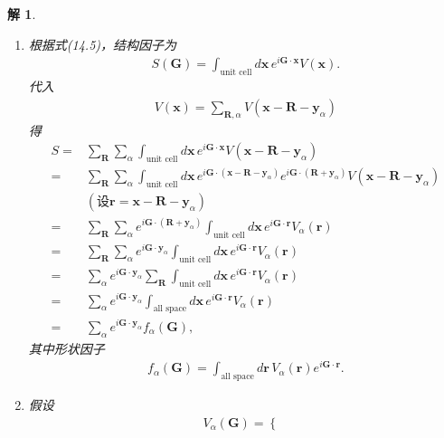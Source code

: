 \documentclass[UTF8,10pt,a4paper]{article}
\theoremstyle{Problem}
\theoremstyle{Solution}
\newtheorem*{sol}{解}
\begin{document}
\begin{sol}
    \begin{enumerate}
        \item[(a)] 根据式(14.5)，结构因子为
        \begin{align}
            S(\bm{G})=\int_{\text{unit cell}}d\bm{x}\,e^{i\bm{G}\cdot\bm{x}}V(\bm{x}).
        \end{align}
        代入
        \begin{align}
            V(\bm{x})=\sum_{\bm{R},\alpha}V(\bm{x}-\bm{R}-\bm{y}_{\alpha})
        \end{align}
        得
        \begin{align}
            \nonumber S=&\sum_{\bm{R}}\sum_{\alpha}\int_{\text{unit cell}}d\bm{x}\,e^{i\bm{G}\cdot\bm{x}}V(\bm{x}-\bm{R}-\bm{y}_{\alpha})\\
            \nonumber=&\sum_{\bm{R}}\sum_{\alpha}\int_{\text{unit cell}}d\bm{x}\,e^{i\bm{G}\cdot(\bm{x}-\bm{R}-\bm{y}_{\alpha})}e^{i\bm{G}\cdot(\bm{R}+\bm{y}_{\alpha})}V(\bm{x}-\bm{R}-\bm{y}_{\alpha})\\
            \nonumber&(\text{设}\bm{r}=\bm{x}-\bm{R}-\bm{y}_{\alpha})\\
            \nonumber=&\sum_{\bm{R}}\sum_{\alpha}e^{i\bm{G}\cdot(\bm{R}+\bm{y}_{\alpha})}\int_{\text{unit cell}}d\bm{x}\,e^{i\bm{G}\cdot\bm{r}}V_{\alpha}(\bm{r})\\
            \nonumber=&\sum_{\bm{R}}\sum_{\alpha}e^{i\bm{G}\cdot\bm{y}_{\alpha}}\int_{\text{unit cell}}d\bm{x}\,e^{i\bm{G}\cdot\bm{r}}V_{\alpha}(\bm{r})\\
            \nonumber=&\sum_{\alpha}e^{i\bm{G}\cdot\bm{y}_{\alpha}}\sum_{\bm{R}}\int_{\text{unit cell}}d\bm{x}\,e^{i\bm{G}\cdot\bm{r}}V_{\alpha}(\bm{r})\\
            \nonumber=&\sum_{\alpha}e^{i\bm{G}\cdot\bm{y}_{\alpha}}\int_{\text{all space}}d\bm{x}\,e^{i\bm{G}\cdot\bm{r}}V_{\alpha}(\bm{r})\\
            =&\sum_{\alpha}e^{i\bm{G}\cdot\bm{y}_{\alpha}}f_{\alpha}(\bm{G}),
        \end{align}
        其中形状因子
        \begin{align}
            f_{\alpha}(\bm{G})=\int_{\text{all space}}d\bm{r}\,V_{\alpha}(\bm{r})e^{i\bm{G}\cdot\bm{r}}.
        \end{align}
        \item[(b)] 假设
        \begin{align}
            V_{\alpha}(\bm{G})=\left\{\begin{array}{ll}

\end{array}
\end{align}
\end{enumerate}
\end{sol}
\end{document}
